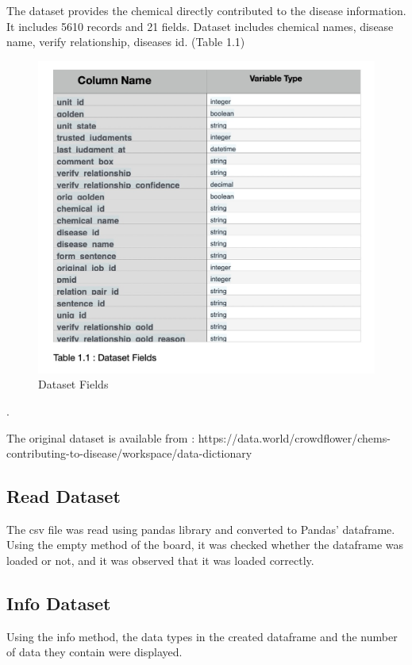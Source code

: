 \documentclass[onecolumn]{article}
\begin{document}
 The dataset provides the chemical directly contributed to the disease information. It includes 5610 records and 21 fields. Dataset includes chemical names, disease name, verify relationship, diseases id. (Table 1.1)
 \begin{figure}[h!t]
\centering
    \includegraphics[width=.6\linewidth]{fig/dataset.jpeg}
\caption{\label{fig:dataset}
Dataset Fields}
\end{figure}.
 
 The original dataset is available from :  https://data.world/crowdflower/chems-contributing-to-disease/workspace/data-dictionary

\subsection{Read Dataset}
The csv file was read using pandas library and converted to  Pandas’ dataframe. Using the empty method of the board, it was checked whether the dataframe was loaded or not, and it was observed that it was loaded correctly.
\subsection{Info Dataset}
Using the info method, the data types in the created dataframe and the number of data they contain were displayed.
\end{document}
